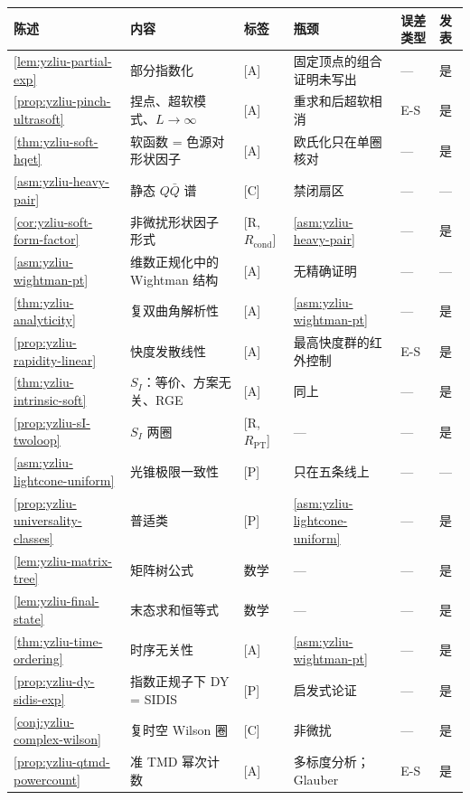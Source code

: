 \begin{table}[htbp]
\centering
\footnotesize
\renewcommand{\arraystretch}{1.08}
\begin{tabular}{@{}p{2.25cm}p{4.2cm}p{1.75cm}p{3.2cm}p{1.0cm}p{0.95cm}@{}}
\toprule
陈述 & 内容 & 标签 & 瓶颈 & 误差类型 & 发表 \\
\midrule
\cref{lem:yzliu-partial-exp} & 部分指数化 & [A] & 固定顶点的组合证明未写出 & — & 是 \\
\cref{prop:yzliu-pinch-ultrasoft} & 捏点、超软模式、$L\to\infty$ & [A] & 重求和后超软相消 & E-S & 是 \\
\cref{thm:yzliu-soft-hqet} & 软函数 = 色源对形状因子 & [A] & 欧氏化只在单圈核对 & — & 是 \\
\cref{asm:yzliu-heavy-pair} & 静态 $Q\bar Q$ 谱 & [C] & 禁闭扇区 & — & — \\
\cref{cor:yzliu-soft-form-factor} & 非微扰形状因子形式 & [R, $R_{\mathrm{cond}}$] & \cref{asm:yzliu-heavy-pair} & — & 是 \\
\cref{asm:yzliu-wightman-pt} & 维数正规化中的 Wightman 结构 & [A] & 无精确证明 & — & — \\
\cref{thm:yzliu-analyticity} & 复双曲角解析性 & [A] & \cref{asm:yzliu-wightman-pt} & — & 是 \\
\cref{prop:yzliu-rapidity-linear} & 快度发散线性 & [A] & 最高快度群的红外控制 & E-S & 是 \\
\cref{thm:yzliu-intrinsic-soft} & $S_I$：等价、方案无关、RGE & [A] & 同上 & — & 是 \\
\cref{prop:yzliu-sI-twoloop} & $S_I$ 两圈 & [R, $R_{\mathrm{PT}}$] & — & — & 是 \\
\cref{asm:yzliu-lightcone-uniform} & 光锥极限一致性 & [P] & 只在五条线上 & — & — \\
\cref{prop:yzliu-universality-classes} & 普适类 & [P] & \cref{asm:yzliu-lightcone-uniform} & — & 是 \\
\cref{lem:yzliu-matrix-tree} & 矩阵树公式 & 数学 & — & — & 是 \\
\cref{lem:yzliu-final-state} & 末态求和恒等式 & 数学 & — & — & 是 \\
\cref{thm:yzliu-time-ordering} & 时序无关性 & [A] & \cref{asm:yzliu-wightman-pt} & — & 是 \\
\cref{prop:yzliu-dy-sidis-exp} & 指数正规子下 DY = SIDIS & [P] & 启发式论证 & — & 是 \\
\cref{conj:yzliu-complex-wilson} & 复时空 Wilson 圈 & [C] & 非微扰 & — & 是 \\
\cref{prop:yzliu-qtmd-powercount} & 准 TMD 幂次计数 & [A] & 多标度分析；Glauber & E-S & 是 \\

\end{tabular}
\end{table}

